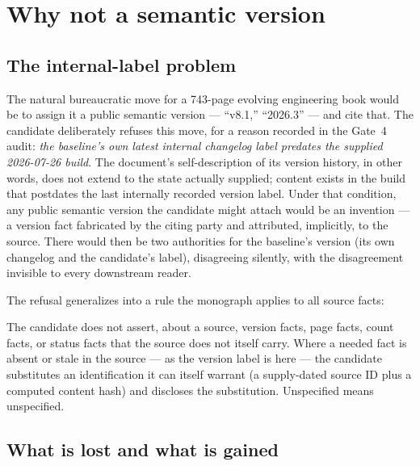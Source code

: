 \section{Why not a semantic version}\label{ch03:version}

\subsection{The internal-label problem}\label{ch03:version:label}

The natural bureaucratic move for a 743-page evolving engineering book
would be to assign it a public semantic version --- ``v8.1,'' ``2026.3''
--- and cite that. The candidate deliberately refuses this move, for a
reason recorded in the Gate~4 audit: \emph{the baseline's own latest
internal changelog label predates the supplied 2026-07-26 build}. The
document's self-description of its version history, in other words, does
not extend to the state actually supplied; content exists in the build
that postdates the last internally recorded version label. Under that
condition, any public semantic version the candidate might attach would
be an invention --- a version fact fabricated by the citing party and
attributed, implicitly, to the source. There would then be two
authorities for the baseline's version (its own changelog and the
candidate's label), disagreeing silently, with the disagreement invisible
to every downstream reader.

The refusal generalizes into a rule the monograph applies to all source
facts:

\begin{ruleenv}\label{ch03:rule:noinvent}
The candidate does not assert, about a source, version facts, page
facts, count facts, or status facts that the source does not itself
carry. Where a needed fact is absent or stale in the source --- as the
version label is here --- the candidate substitutes an identification it
can itself warrant (a supply-dated source ID plus a computed content
hash) and discloses the substitution. Unspecified means unspecified.
\end{ruleenv}

\subsection{What is lost and what is gained}\label{ch03:version:tradeoff}


